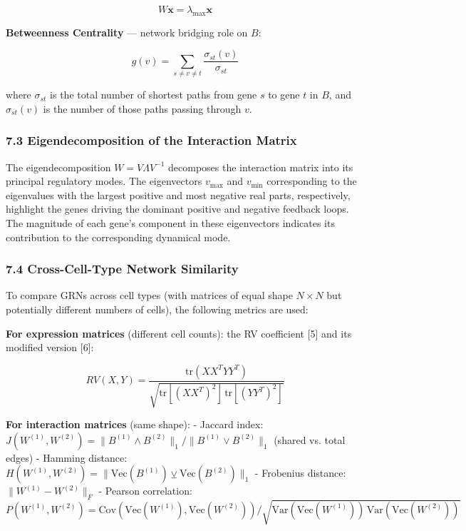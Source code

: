 \documentclass[11pt]{article}
\begin{document}
\begin{equation}
W\mathbf{x} = \lambda_{\max}\mathbf{x} 
\end{equation}


\textbf{Betweenness Centrality} — network bridging role on $B$:

\begin{equation}
g(v) = \sum_{s \neq v \neq t} \frac{\sigma_{st}(v)}{\sigma_{st}} 
\end{equation}


where $\sigma_{st}$ is the total number of shortest paths from gene $s$ to gene $t$ in $B$, and $\sigma_{st}(v)$ is the number of those paths passing through $v$.


\subsubsection*{7.3 Eigendecomposition of the Interaction Matrix}

The eigendecomposition $W = V\Lambda V^{-1}$ decomposes the interaction matrix into its principal regulatory modes. The eigenvectors $v_{\max}$ and $v_{\min}$ corresponding to the eigenvalues with the largest positive and most negative real parts, respectively, highlight the genes driving the dominant positive and negative feedback loops. The magnitude of each gene's component in these eigenvectors indicates its contribution to the corresponding dynamical mode.


\subsubsection*{7.4 Cross-Cell-Type Network Similarity}

To compare GRNs across cell types (with matrices of equal shape $N \times N$ but potentially different numbers of cells), the following metrics are used:

\textbf{For expression matrices} (different cell counts): the RV coefficient [5] and its modified version [6]:

\begin{equation}
RV(X,Y) = \frac{\mathrm{tr}(XX^TYY^T)}{\sqrt{\mathrm{tr}[(XX^T)^2]\,\mathrm{tr}[(YY^T)^2]}} 
\end{equation}


\textbf{For interaction matrices} (same shape):
- Jaccard index: $J(W^{(1)},W^{(2)}) = \|B^{(1)} \wedge B^{(2)}\|_1 / \|B^{(1)} \vee B^{(2)}\|_1$ (shared vs. total edges)
- Hamming distance: $H(W^{(1)},W^{(2)}) = \|\mathrm{Vec}(B^{(1)}) \veebar \mathrm{Vec}(B^{(2)})\|_1$
- Frobenius distance: $\|W^{(1)}-W^{(2)}\|_F$
- Pearson correlation: $P(W^{(1)},W^{(2)}) = \mathrm{Cov}(\mathrm{Vec}(W^{(1)}),\mathrm{Vec}(W^{(2)})) / \sqrt{\mathrm{Var}(\mathrm{Vec}(W^{(1)}))\,\mathrm{Var}(\mathrm{Vec}(W^{(2)}))}$
\end{document}
